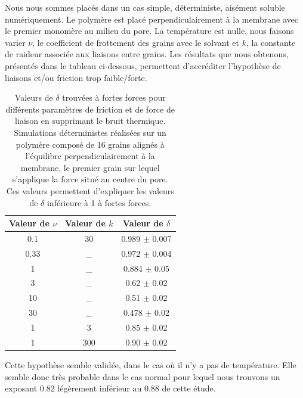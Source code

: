 Nous nous sommes placés dans un cas simple, déterministe, aisément soluble numériquement. Le polymère est placé perpendiculairement à la membrane avec le premier monomère au milieu du pore. La température est nulle, nous faisons varier $\nu$, le coefficient de frottement des grains avec le solvant et $k$, la constante de raideur associée aux liaisons entre grains. Les résultats que nous obtenons, présentés dans le tableau ci-dessous, permettent d'accréditer l'hypothèse de liaisons et/ou friction trop faible/forte.

\begin{table}[H]
\begin{center}
\begin{tabular}{|c|c|c|}
  \hline
  Valeur de $\nu$ & Valeur de $k$ & Valeur de $\delta$ \\
  \hline
  0.1 & 30 & 0.989 $\pm$ 0.007\\
  0.33 & \_  & 0.972 $\pm$ 0.004 \\
  1 & \_ & 0.884 $\pm$ 0.05  \\
  3 & \_  &  0.62 $\pm$ 0.02  \\
  10 & \_  &  0.51 $\pm$ 0.02 \\
  30 & \_  &  0.478 $\pm$ 0.02  \\
  1 & 3  &  0.85 $\pm$ 0.02  \\
  1 & 300  &  0.90 $\pm$ 0.02\\
  \hline
 
    
\end{tabular}
\caption[Influence de la friction et de la force des liaisons sur le comportement à forte force]{Valeurs de $\delta$ trouvées à fortes forces pour différents paramètres de friction et de force de liaison en supprimant le bruit thermique. Simulations déterministes réalisées sur un polymère composé de 16 grains alignés à l'équilibre perpendiculairement à la membrane, le premier grain sur lequel s'applique la force situé au centre du pore. Ces valeurs permettent d'expliquer les valeurs de $\delta$ inférieure à 1 à fortes forces.}  

\end{center}

\end{table}

Cette hypothèse semble validée, dans le cas où il n'y a pas de température. Elle semble donc très probable dans le cas normal pour lequel nous trouvons un exposant 0.82 légèrement inférieur au 0.88 de cette étude.

